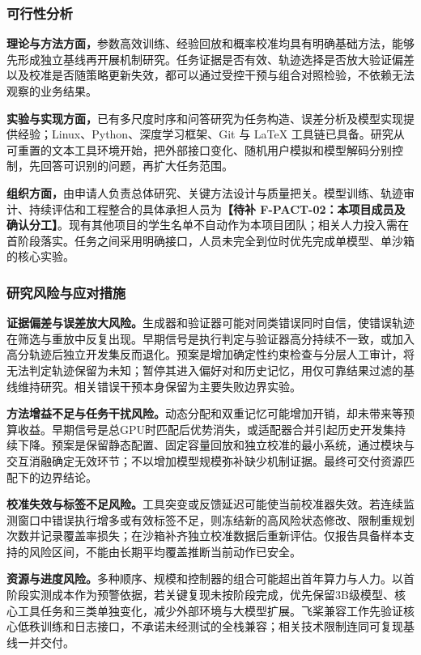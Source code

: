 \subsubsection{可行性分析}

\textbf{理论与方法方面，}参数高效训练、经验回放和概率校准均具有明确基础方法，能够先形成独立基线再开展机制研究。任务证据是否有效、轨迹选择是否放大验证偏差以及校准是否随策略更新失效，都可以通过受控干预与组合对照检验，不依赖无法观察的业务结果。

\textbf{实验与实现方面，}已有多尺度时序和问答研究为任务构造、误差分析及模型实现提供经验；Linux、Python、深度学习框架、Git 与 LaTeX 工具链已具备。研究从可重置的文本工具环境开始，把外部接口变化、随机用户模拟和模型解码分别控制，先回答可识别的问题，再扩大任务范围。

\textbf{组织方面，}由申请人负责总体研究、关键方法设计与质量把关。模型训练、轨迹审计、持续评估和工程整合的具体承担人员为\textbf{【待补 F-PACT-02：本项目成员及确认分工】}。现有其他项目的学生名单不自动作为本项目团队；相关人力投入需在首阶段落实。任务之间采用明确接口，人员未完全到位时优先完成单模型、单沙箱的核心实验。

\subsubsection{研究风险与应对措施}

\textbf{证据偏差与误差放大风险。}生成器和验证器可能对同类错误同时自信，使错误轨迹在筛选与重放中反复出现。早期信号是执行判定与验证器高分持续不一致，或加入高分轨迹后独立开发集反而退化。预案是增加确定性约束检查与分层人工审计，将无法判定轨迹保留为未知；暂停其进入偏好对和历史记忆，用仅可靠结果过滤的基线维持研究。相关错误干预本身保留为主要失败边界实验。

\textbf{方法增益不足与任务干扰风险。}动态分配和双重记忆可能增加开销，却未带来等预算收益。早期信号是总GPU时匹配后优势消失，或适配器合并引起历史开发集持续下降。预案是保留静态配置、固定容量回放和独立校准的最小系统，通过模块与交互消融确定无效环节；不以增加模型规模弥补缺少机制证据。最终可交付资源匹配下的边界结论。

\textbf{校准失效与标签不足风险。}工具突变或反馈延迟可能使当前校准器失效。若连续监测窗口中错误执行增多或有效标签不足，则冻结新的高风险状态修改、限制重规划次数并记录覆盖率损失；在沙箱补齐独立校准数据后重新评估。仅报告具备样本支持的风险区间，不能由长期平均覆盖推断当前动作已安全。

\textbf{资源与进度风险。}多种顺序、规模和控制器的组合可能超出首年算力与人力。以首阶段实测成本作为预警依据，若关键复现未按阶段完成，优先保留3B级模型、核心工具任务和三类单独变化，减少外部环境与大模型扩展。飞桨兼容工作先验证核心低秩训练和日志接口，不承诺未经测试的全栈兼容；相关技术限制连同可复现基线一并交付。
